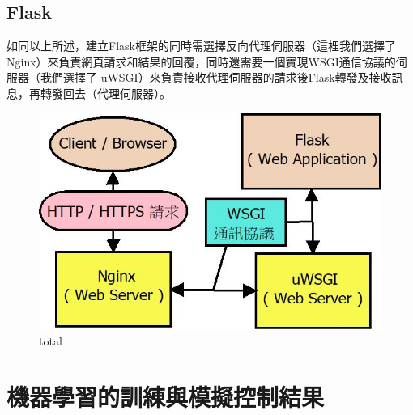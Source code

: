 \documentclass[14pt,a4paper]{report}  %
\begin{document}
\section{Flask}
 如同以上所述，建立Flask框架的同時需選擇反向代理伺服器（這裡我們選擇了Nginx）來負責網頁請求和結果的回覆，同時還需要一個實現WSGI通信協議的伺服器（我們選擇了 uWSGI）來負責接收代理伺服器的請求後Flask轉發及接收訊息，再轉發回去（代理伺服器）。\\
 
\begin{figure}[hbt!]
\begin{center}
\includegraphics[width=15cm]{total}
\caption{\Large total}
\label{total}
\end{center}
\end{figure}

\chapter{機器學習的訓練與模擬控制結果}
\end{document}
